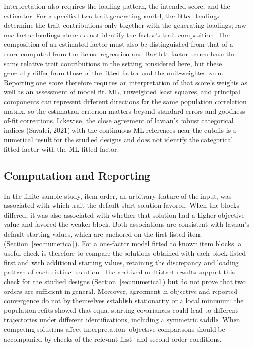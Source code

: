 Interpretation also requires the loading pattern, the intended score, and the estimator. For a specified two-trait generating model, the fitted loadings determine the trait contributions only together with the generating loadings; raw one-factor loadings alone do not identify the factor's trait composition. The composition of an estimated factor must also be distinguished from that of a score computed from the items: regression and Bartlett factor scores have the same relative trait contributions in the setting considered here, but these generally differ from those of the fitted factor and the unit-weighted sum. Reporting one score therefore requires an interpretation of that score's weights as well as an assessment of model fit. ML, unweighted least squares, and principal components can represent different directions for the same population correlation matrix, so the estimation criterion matters beyond standard errors and goodness-of-fit corrections. Likewise, the close agreement of lavaan's robust categorical indices (Savalei, 2021) with the continuous-ML references near the cutoffs is a numerical result for the studied designs and does not identify the categorical fitted factor with the ML fitted factor.

\subsection{Computation and Reporting}

In the finite-sample study, item order, an arbitrary feature of the input, was associated with which trait the default-start solution favored. When the blocks differed, it was also associated with whether that solution had a higher objective value and favored the weaker block. Both associations are consistent with lavaan's default starting values, which are anchored on the first-listed item (Section~\ref{sec:numerical}). For a one-factor model fitted to known item blocks, a useful check is therefore to compare the solutions obtained with each block listed first and with additional starting values, retaining the discrepancy and loading pattern of each distinct solution. The archived multistart results support this check for the studied designs (Section~\ref{sec:numerical}) but do not prove that two orders are sufficient in general. Moreover, agreement in objective and reported convergence do not by themselves establish stationarity or a local minimum: the population refits showed that equal starting covariances could lead to different trajectories under different identifications, including a symmetric saddle. When competing solutions affect interpretation, objective comparisons should be accompanied by checks of the relevant first- and second-order conditions.

